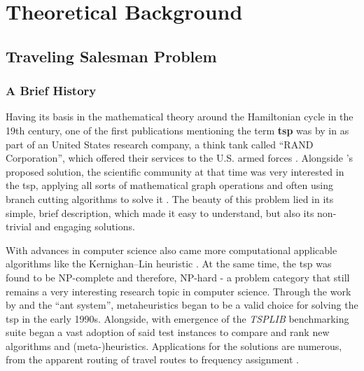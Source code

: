 
\chapter{Theoretical Background} %
\label{chap:background}
\glsresetall


\section{Traveling Salesman Problem}

\subsection{A Brief History}

Having its basis in the mathematical theory around the Hamiltonian cycle in the 19th century, one of the first publications mentioning the term \textbf{\gls{tsp}} was by  in \citeyear{robinson1949hamiltonian} as part of an United States research company, a think tank called \enquote{RAND Corporation}, which offered their services to the U.S. armed forces \cite{schrijver2005history}. Alongside \citeauthor{robinson1949hamiltonian}'s proposed solution, the scientific community at that time was very interested in the \gls{tsp}, applying all sorts of mathematical graph operations and often using branch cutting algorithms to solve it \cite{lawler1985traveling}. The beauty of this problem lied in its simple, brief description, which made it easy to understand, but also its non-trivial and engaging solutions.

With advances in computer science also came more computational applicable algorithms like the Kernighan–Lin heuristic \cite{lin1973effective}. At the same time, the \gls{tsp} was found to be NP-complete and therefore, NP-hard \cite{papadimitriou1976some} - a problem category that still remains a very interesting research topic in computer science. Through the work by \citet{dorigo1991ant} and the \enquote{ant system}, metaheuristics began to be a valid choice for solving the \gls{tsp} in the early 1990s. Alongside, with emergence of the \textit{TSPLIB} benchmarking suite \cite{reinelt1991tsplib} began a vast adoption of said test instances to compare and rank new algorithms and (meta-)heuristics.
Applications for the solutions are numerous, from the apparent routing of travel routes to frequency assignment \cite{punnen2007traveling}.

